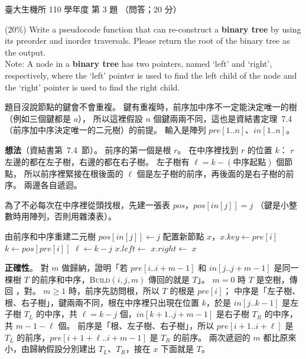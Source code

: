 \begin{pastexam}[label={px:ntu-110-bime-ds-03}]{臺大生機所 110 學年度 第 3 題}
（問答；20 分）

(20\%) Write a pseudocode function that can re-construct a \textbf{binary tree} by using its preorder
and inorder traversals. Please return the root of the binary tree as the output.\\
Note: A node in a \textbf{binary tree} has two pointers, named `left' and `right', respectively, where
the `left' pointer is used to find the left child of the node and the `right' pointer is used to find
the right child.
\end{pastexam}

\begin{pastsoln}
題目沒說節點的鍵會不會重複。 鍵有重複時，前序加中序不一定能決定唯一的樹（例如三個鍵都是 $a$），
所以這裡假設 $n$ 個鍵兩兩不同，這也是資結書定理~7.4（前序加中序決定唯一的二元樹）的前提。
輸入是陣列 $\mathit{pre}[1..n]$、$\mathit{in}[1..n]$。

\textbf{想法}（資結書第~7.4~節）。 前序的第一個是根 $r$。 在中序裡找到 $r$ 的位置 $k$：
$r$ 左邊的都在左子樹，右邊的都在右子樹。 左子樹有 $\ell = k - (\text{中序起點})$ 個節點，
所以前序裡緊接在根後面的 $\ell$ 個是左子樹的前序，再後面的是右子樹的前序。 兩邊各自遞迴。

為了不必每次在中序裡從頭找根，先建一張表 $\mathit{pos}$，$\mathit{pos}[\mathit{in}[j]] = j$
（鍵是小整數時用陣列，否則用雜湊表）。

\begin{pseudo}{由前序和中序重建二元樹}
        \State $\mathit{pos}[\mathit{in}[j]] \gets j$
    \EndFor
    \State \Return {}
\EndFunction
\Statex
{} 
        \State \Return \NIL
    \EndIf
    \State 配置新節點 $x$，$x.\mathit{key} \gets \mathit{pre}[i]$
    \State $k \gets \mathit{pos}[\mathit{pre}[i]]$ 
    \State $\ell \gets k - j$ 
    \State $x.\mathit{left} \gets$ 
    \State $x.\mathit{right} \gets$ 
    \State \Return $x$
\EndFunction
\end{pseudo}

\textbf{正確性}。 對 $m$ 做歸納，證明「若 $\mathit{pre}[i..i{+}m{-}1]$ 和
$\mathit{in}[j..j{+}m{-}1]$ 是同一棵樹 $T$ 的前序和中序，\textsc{Build}$(i, j, m)$ 傳回的就是 $T$」。
$m = 0$ 時 $T$ 是空樹，傳回 \NIL，對。 $m \ge 1$ 時，前序先訪問根，所以 $T$ 的根是 $\mathit{pre}[i]$；
中序是「左子樹、根、右子樹」，鍵兩兩不同，根在中序裡只出現在位置 $k$，於是
$\mathit{in}[j..k{-}1]$ 是左子樹 $T_L$ 的中序，共 $\ell = k - j$ 個，$\mathit{in}[k{+}1..j{+}m{-}1]$
是右子樹 $T_R$ 的中序，共 $m - 1 - \ell$ 個。 前序是「根、左子樹、右子樹」，所以
$\mathit{pre}[i{+}1..i{+}\ell]$ 是 $T_L$ 的前序，$\mathit{pre}[i{+}1{+}\ell..i{+}m{-}1]$ 是 $T_R$ 的前序。
兩次遞迴的 $m$ 都比原來小，由歸納假設分別建出 $T_L$、$T_R$，接在 $x$ 下面就是 $T$。


\end{pastsoln}
